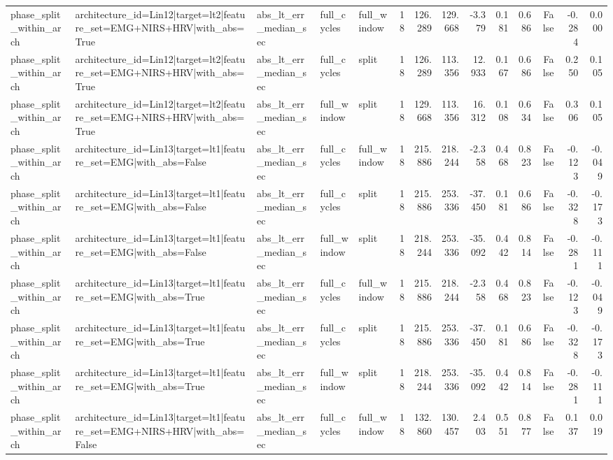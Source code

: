 \begin{table}
\begin{tabular}{lllllrrrrrrrrr}
phase_split_within_arch & architecture_id=Lin12|target=lt2|feature_set=EMG+NIRS+HRV|with_abs=True & abs_lt_err_median_sec & full_cycles & full_window & 18 & 126.289 & 129.668 & -3.379 & 0.181 & 0.686 & False & -0.284 & 0.000 \\
phase_split_within_arch & architecture_id=Lin12|target=lt2|feature_set=EMG+NIRS+HRV|with_abs=True & abs_lt_err_median_sec & full_cycles & split & 18 & 126.289 & 113.356 & 12.933 & 0.167 & 0.686 & False & 0.250 & 0.105 \\
phase_split_within_arch & architecture_id=Lin12|target=lt2|feature_set=EMG+NIRS+HRV|with_abs=True & abs_lt_err_median_sec & full_window & split & 18 & 129.668 & 113.356 & 16.312 & 0.108 & 0.634 & False & 0.306 & 0.105 \\
phase_split_within_arch & architecture_id=Lin13|target=lt1|feature_set=EMG|with_abs=False & abs_lt_err_median_sec & full_cycles & full_window & 18 & 215.886 & 218.244 & -2.358 & 0.468 & 0.823 & False & -0.123 & -0.049 \\
phase_split_within_arch & architecture_id=Lin13|target=lt1|feature_set=EMG|with_abs=False & abs_lt_err_median_sec & full_cycles & split & 18 & 215.886 & 253.336 & -37.450 & 0.181 & 0.686 & False & -0.328 & -0.173 \\
phase_split_within_arch & architecture_id=Lin13|target=lt1|feature_set=EMG|with_abs=False & abs_lt_err_median_sec & full_window & split & 18 & 218.244 & 253.336 & -35.092 & 0.442 & 0.814 & False & -0.281 & -0.111 \\
phase_split_within_arch & architecture_id=Lin13|target=lt1|feature_set=EMG|with_abs=True & abs_lt_err_median_sec & full_cycles & full_window & 18 & 215.886 & 218.244 & -2.358 & 0.468 & 0.823 & False & -0.123 & -0.049 \\
phase_split_within_arch & architecture_id=Lin13|target=lt1|feature_set=EMG|with_abs=True & abs_lt_err_median_sec & full_cycles & split & 18 & 215.886 & 253.336 & -37.450 & 0.181 & 0.686 & False & -0.328 & -0.173 \\
phase_split_within_arch & architecture_id=Lin13|target=lt1|feature_set=EMG|with_abs=True & abs_lt_err_median_sec & full_window & split & 18 & 218.244 & 253.336 & -35.092 & 0.442 & 0.814 & False & -0.281 & -0.111 \\
phase_split_within_arch & architecture_id=Lin13|target=lt1|feature_set=EMG+NIRS+HRV|with_abs=False & abs_lt_err_median_sec & full_cycles & full_window & 18 & 132.860 & 130.457 & 2.403 & 0.551 & 0.877 & False & 0.137 & 0.019 \\

\end{tabular}
\end{table}
